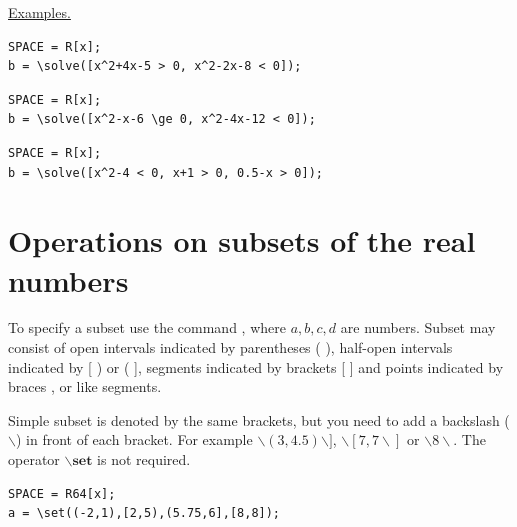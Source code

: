 \underline{Examples. }

\vspace*{-2mm}
\begin{verbatim}
SPACE = R[x];
b = \solve([x^2+4x-5 > 0, x^2-2x-8 < 0]);
\end{verbatim}


\begin{verbatim}
SPACE = R[x];
b = \solve([x^2-x-6 \ge 0, x^2-4x-12 < 0]);
\end{verbatim}

\ex{$SPACE=R[x]; $\\
\hspace*{4mm} $b=solve([x^2-x-6 \ge 0, x^2-4x-12 < 0]);$}{$(-4,-2]\cup[3,4)$.}

\begin{verbatim}
SPACE = R[x];
b = \solve([x^2-4 < 0, x+1 > 0, 0.5-x > 0]);
\end{verbatim}


\section{Operations on subsets of the real numbers}

To specify a subset use the command \comm{set}{((a,b),(c,d])}, where $a,b,c,d$ are numbers.
Subset may consist of open intervals indicated by parentheses ( ), half-open intervals indicated by [ ) or ( ],
segments indicated by brackets [ ] and points indicated by braces { }, or like segments.

Simple subset is denoted by the same brackets, but you need to add a backslash ($ \backslash $) in front of each bracket. 
For example $ \backslash (3,4.5) \backslash] $, $ \backslash[7, 7 \backslash]$ or $\backslash{8 \backslash}$.
The operator $ \backslash {\mathbf {set}} $ is not required.

\begin{verbatim}
SPACE = R64[x];
a = \set((-2,1),[2,5),(5.75,6],[8,8]);
\end{verbatim}

